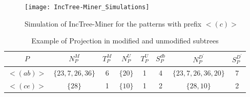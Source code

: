 \begin{figure*}[!tb]
\centering
\texttt{[image: IncTree-Miner\_Simulations]}
\caption{Simulation of IncTree-Miner for the patterns with prefix $< (c) >$} \label{figure:inc_tree_miner_simulation}
\hfil
\end{figure*}

\begin{table*}[!htb]
\centering
\begin{tabular}{|c|c|c|c|c|c|c|c|}
\hline
$P$ & $N_{P}^{M}$ & $T_{P}^{M}$ &$N_{P}^{U}$ & $T_{P}^{U}$ & $S_{P}^{db}$ & $N_{P}^{D^{\prime}}$ & $S_{P}^{D^{\prime}}$\\
\hline
$< (ab) >$ & $\{  23,7,26,36 \}$ & 6 & $\{ 20 \}$ & 1 & 4 & $\{ 23,7,26,36, 20\}$ & 7 \\ \hline  
$< (ce) >$ & $\{  28 \}$ & 1 & $\{ 10 \}$ & 1 & 2 & $\{28, 10\}$ & 2\\
\hline
\end{tabular}
\caption{Example of Projection in modified and unmodified subtrees}
\label{table:separate_projection_example}
\end{table*}


